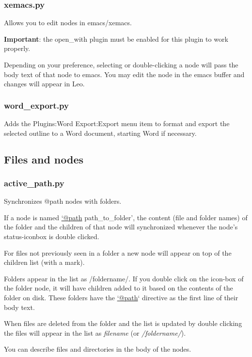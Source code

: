 \documentclass[a4paper,10pt,english]{sphinxmanual}
\begin{document}
\subsubsection{xemacs.py}
\label{plugins:xemacs-py}
Allows you to edit nodes in emacs/xemacs.

\textbf{Important}: the open\_with plugin must be enabled for this plugin to work
properly.

Depending on your preference, selecting or double-clicking a node will pass the
body text of that node to emacs. You may edit the node in the emacs buffer and
changes will appear in Leo.


\subsubsection{word\_export.py}
\label{plugins:word-export-py}
Adds the Plugins:Word Export:Export menu item to format and export
the selected outline to a Word document, starting Word if necessary.


\subsection{Files and nodes}
\label{plugins:files-and-nodes}

\subsubsection{active\_path.py}
\label{plugins:active-path-py}
Synchronizes @path nodes with folders.

If a node is named \href{mailto:'@path}{`@path} path\_to\_folder', the content (file and folder names)
of the folder and the children of that node will synchronized whenever the
node's status-iconbox is double clicked.

For files not previously seen in a folder a new node will appear on top of the
children list (with a mark).

Folders appear in the list as /foldername/. If you double click on the icon-box
of the folder node, it will have children added to it based on the contents of
the folder on disk. These folders have the \href{mailto:'@path}{`@path}` directive as the first line
of their body text.

When files are deleted from the folder and the list is updated by double
clicking the files will appear in the list as \emph{filename} (or \emph{/foldername/}).

You can describe files and directories in the body of the nodes.
\end{document}
